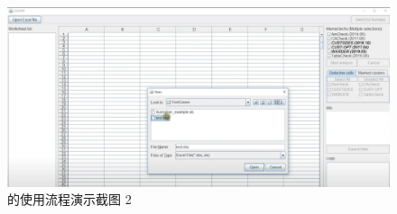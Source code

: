\begin{figure}[tp]   
    \centering
    \includegraphics[width=\textwidth]{figure/sg/sguard-2.png}
    \caption{\sg 的使用流程演示截图 2}
    \label{figure-sg2}
\end{figure}